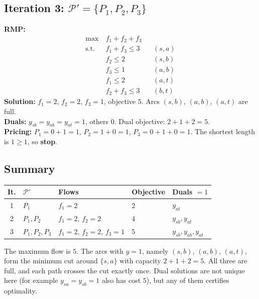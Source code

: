 \documentclass[11pt]{article}
\begin{document}
\subsection*{Iteration 3: $\mathcal{P}'=\{P_1,P_2,P_3\}$}
\textbf{RMP:}
\begin{align*}
\max\ & f_1+f_2+f_3\\
\text{s.t.}\ & f_1+f_3\le 3 && (s,a)\\
& f_2\le 2 && (s,b)\\
& f_3\le 1 && (a,b)\\
& f_1\le 2 && (a,t)\\
& f_2+f_3\le 3 && (b,t)
\end{align*}
\textbf{Solution:} $f_1=2$, $f_2=2$, $f_3=1$, objective $5$. Arcs $(s,b)$, $(a,b)$, $(a,t)$ are full.\\
\textbf{Duals:} $y_{sb}=y_{ab}=y_{at}=1$, others $0$. Dual objective: $2+1+2=5$.\\
\textbf{Pricing:} $P_1=0+1=1$, $P_2=1+0=1$, $P_3=0+1+0=1$. The shortest length is $1\ge 1$, so \textbf{stop}.

\subsection*{Summary}
\begin{center}
\small
\begin{tabular}{@{}cllll@{}}
\toprule
It. & $\mathcal{P}'$ & Flows & Objective & Duals $=1$ \\
\midrule
1 & $P_1$ & $f_1=2$ & 2 & $y_{at}$ \\
2 & $P_1,P_2$ & $f_1=2,\,f_2=2$ & 4 & $y_{sb},y_{at}$ \\
3 & $P_1,P_2,P_3$ & $f_1=2,\,f_2=2,\,f_3=1$ & 5 & $y_{sb},y_{ab},y_{at}$ \\
\bottomrule
\end{tabular}
\end{center}

The maximum flow is $5$. The arcs with $y=1$, namely $(s,b)$, $(a,b)$, $(a,t)$, form the minimum cut around $\{s,a\}$ with capacity $2+1+2=5$. All three are full, and each path crosses the cut exactly once. Dual solutions are not unique here (for example $y_{sa}=y_{sb}=1$ also has cost $5$), but any of them certifies optimality.
\end{document}
